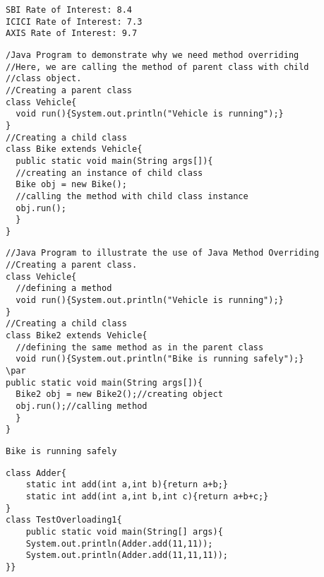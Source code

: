 \documentclass{book}
\def\lthtmlcheckvsize{\ifdim\ht\sizebox<\vsize 
  \ifdim\wd\sizebox<\hsize\expandafter\hfill\fi \expandafter\vfill
  \else\expandafter\vss\fi}%
\begin{document}
{\newpage\clearpage
{}%
\begin{lstlisting}
SBI Rate of Interest: 8.4
ICICI Rate of Interest: 7.3
AXIS Rate of Interest: 9.7
\end{lstlisting}%
\lthtmlfigureZ
\lthtmlcheckvsize\clearpage}

{\newpage\clearpage
{}%
\begin{lstlisting}
/Java Program to demonstrate why we need method overriding  
//Here, we are calling the method of parent class with child  
//class object.  
//Creating a parent class  
class Vehicle{  
  void run(){System.out.println("Vehicle is running");}  
}  
//Creating a child class  
class Bike extends Vehicle{  
  public static void main(String args[]){  
  //creating an instance of child class  
  Bike obj = new Bike();  
  //calling the method with child class instance  
  obj.run();  
  }  
}  
\end{lstlisting}%
\lthtmlfigureZ
\lthtmlcheckvsize\clearpage}

{\newpage\clearpage
{}%
\begin{lstlisting}
//Java Program to illustrate the use of Java Method Overriding  
//Creating a parent class.  
class Vehicle{  
  //defining a method  
  void run(){System.out.println("Vehicle is running");}  
}  
//Creating a child class  
class Bike2 extends Vehicle{  
  //defining the same method as in the parent class  
  void run(){System.out.println("Bike is running safely");}  
\par
public static void main(String args[]){  
  Bike2 obj = new Bike2();//creating object  
  obj.run();//calling method  
  }  
}  
\end{lstlisting}%
\lthtmlfigureZ
\lthtmlcheckvsize\clearpage}

{\newpage\clearpage
{}%
\begin{lstlisting}
Bike is running safely
\end{lstlisting}%
\lthtmlfigureZ
\lthtmlcheckvsize\clearpage}

{\newpage\clearpage
{}%
\begin{lstlisting}
class Adder{  
	static int add(int a,int b){return a+b;}  
	static int add(int a,int b,int c){return a+b+c;}  
}  
class TestOverloading1{  
	public static void main(String[] args){  
	System.out.println(Adder.add(11,11));  
	System.out.println(Adder.add(11,11,11));  
}}  
\end{lstlisting}%
\lthtmlfigureZ
\lthtmlcheckvsize\clearpage}
\end{document}
